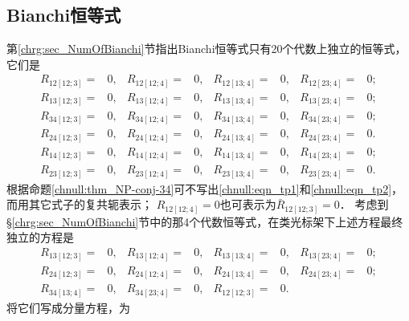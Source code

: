 \subsection{Bianchi恒等式}
第\ref{chrg:sec_NumOfBianchi}节指出Bianchi恒等式只有20个代数上独立的恒等式，它们是
\begin{subequations}
    \begin{align}
        R_{12[12;3]}=&0, & R_{12[12;4]}=&0, & R_{12[13;4]}=&0, & R_{12[23;4]}=&0;  \\
        R_{13[12;3]}=&0, & R_{13[12;4]}=&0, & R_{13[13;4]}=&0, & R_{13[23;4]}=&0;  \\
        R_{34[12;3]}=&0, & R_{34[12;4]}=&0, & R_{34[13;4]}=&0, & R_{34[23;4]}=&0;  \\
        R_{24[12;3]}=&0, & R_{24[12;4]}=&0, & R_{24[13;4]}=&0, & R_{24[23;4]}=&0.  \\
        R_{14[12;3]}=&0, & R_{14[12;4]}=&0, & R_{14[13;4]}=&0, & R_{14[23;4]}=&0; \label{chnull:eqn_tp1} \\
        R_{23[12;3]}=&0, & R_{23[12;4]}=&0, & R_{23[13;4]}=&0, & R_{23[23;4]}=&0. \label{chnull:eqn_tp2}
    \end{align}
\end{subequations}
根据命题\ref{chnull:thm_NP-conj-34}可不写出\eqref{chnull:eqn_tp1}和\eqref{chnull:eqn_tp2}，
而用其它式子的复共轭表示；
$R_{12[12;4]}= 0$也可表示为$\bar{R}_{12[12;3]}=0$．
考虑到\S\ref{chrg:sec_NumOfBianchi}节中的那4个代数恒等式，在类光标架下上述方程最终
独立的方程是
\begin{subequations}
    \begin{align}
        R_{13[12;3]}=&0, & R_{13[12;4]}=&0, & R_{13[13;4]}=&0, & R_{13[23;4]}=&0;  \\
        R_{24[12;3]}=&0, & R_{24[12;4]}=&0, & R_{24[13;4]}=&0, & R_{24[23;4]}=&0; \\
        R_{34[13;4]}=&0, & R_{34[23;4]}=&0, & R_{12[12;3]}=&0. & {} &
    \end{align}
\end{subequations}
将它们写成分量方程\cite[\S 8e]{chandrasekhar-1983}\cite[\S 7.3]{stephani-exe-2003}，为
